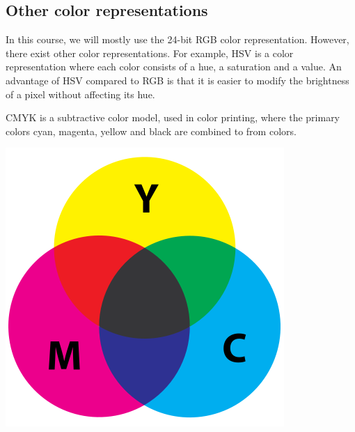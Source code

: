 \documentclass{book}
\begin{document}
\subsection{Other color representations}
In this course, we will mostly use the 24-bit RGB color representation. However, there exist other color representations. For example, HSV is a color representation where each color consists of a hue, a saturation and a value. An advantage of HSV compared to RGB is that it is easier to modify the brightness of a pixel without affecting its hue.

CMYK is a subtractive color model, used in color printing, where the primary colors cyan, magenta, yellow and black are combined to from colors.
\begin{center}
\includegraphics[scale=0.15]{cmyk.png}
\end{center}
\end{document}
